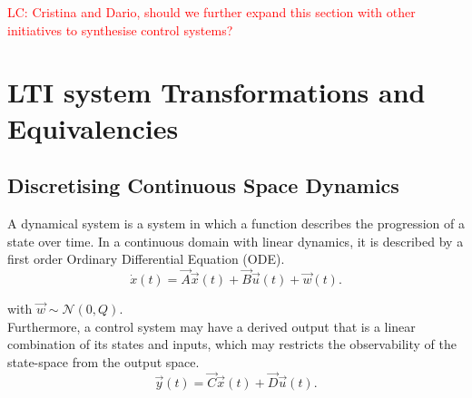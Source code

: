 \documentclass[runningheads,a4paper]{llncs}
\begin{document}
\textcolor{red}{LC: Cristina and Dario, should we further expand this section with other initiatives to synthesise control systems?}

\newpage


  

\newpage
\appendix
\section{LTI system Transformations and Equivalencies} \label{sec:appendix}

\subsection{Discretising Continuous Space Dynamics}

A dynamical system is a system in which a function describes the progression of a state over time. 
In a continuous domain with linear dynamics, it is described by a first order Ordinary Differential Equation (ODE).
\begin{equation}
\dot{x}(t)=\vec{A}\vec{x}(t)+\vec{B}\vec{u}(t) +\vec{w}(t).
\label{eq:dynamical}
\end{equation}

\noindent with $\vec{w} \sim \mathcal{N}(0,Q)$.\\
Furthermore, a control system may have a derived output that is a linear combination of its states and inputs, 
which may restricts the observability of the state-space from the output space.
\begin{equation}
\vec{y}(t)=\vec{C}\vec{x}(t)+\vec{D}\vec{u}(t).
\end{equation}
\end{document}
